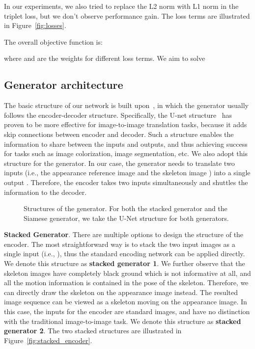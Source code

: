 \documentclass[journal]{IEEEtran}
\begin{document}
In our experiments, we also tried to replace the L2 norm with L1 norm in the triplet loss, but we don't observe performance gain. The loss terms are illustrated in Figure~\ref{fig:losses}.

The overall objective function is:

where  and  are the weights for different loss terms.
We aim to solve


\subsection{Generator architecture}
The basic structure of our network is built upon~\cite{DBLP:journals/corr/IsolaZZE16}, in which the generator usually follows the encoder-decoder structure. Specifically, the U-net structure~\cite{DBLP:conf/miccai/RonnebergerFB15} has proven to be more effective for image-to-image translation tasks, because it adds skip connections between encoder and decoder. Such a structure enables the information to share between the inputs and outputs, and thus achieving success for tasks such as image colorization, image segmentation, etc.
We also adopt this structure for the generator. In our case, the generator needs to translate two inputs (i.e., the appearance reference image  and the skeleton image ) into a single output . Therefore, the encoder takes two inputs simultaneously and shuttles the information to the decoder.
\begin{figure}
\centering
{}
\hspace{.01in}
\caption{Structures of the generator. For both the stacked generator and the Siamese generator, we take the U-Net structure for both generators. }
\label{fig:encoder}
\end{figure}

\textbf{Stacked Generator}. There are multiple options to design the structure of the encoder. The most straightforward way is to stack the two input images as a single input (i.e., ), thus the standard encoding network can be applied directly. We denote this structure as \textbf{stacked generator 1}. We further observe that the skeleton images have completely black ground which is not informative at all, and all the motion information is contained in the pose of the skeleton. Therefore, we can directly draw the skeleton on the appearance image instead. The resulted image sequence can be viewed as a skeleton moving on the appearance image. In this case, the inputs for the encoder are standard images, and have no distinction with the traditional image-to-image task. We denote this structure as \textbf{stacked generator 2}. The two stacked structures are illustrated in Figure~\ref{fig:stacked_encoder}.
\end{document}

